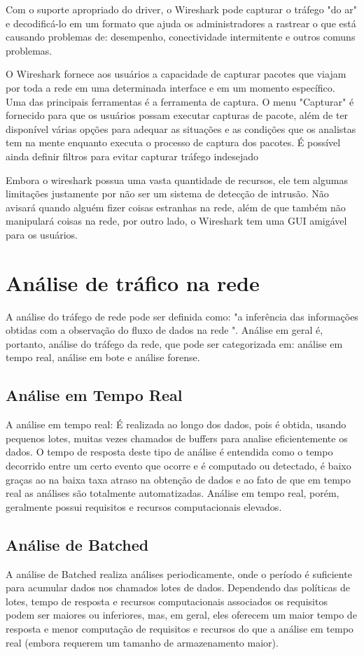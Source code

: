 \documentclass[12pt]{article}
\begin{document}
Com o suporte apropriado do driver, o Wireshark pode
capturar o tráfego "do ar" e decodificá-lo em um formato que
ajuda os administradores a rastrear o que está causando problemas
de: desempenho, conectividade intermitente e outros comuns
problemas.

O Wireshark fornece aos usuários a capacidade de capturar
pacotes que viajam por toda a rede em uma determinada
interface e em um momento específico. Uma das principais ferramentas é a
ferramenta de captura. O menu "Capturar" é fornecido para que os usuários possam
executar capturas de pacote, além de ter disponível várias opções
para adequar as situações e as condições que os analistas
tem na mente enquanto executa o processo de captura dos pacotes. É possível ainda definir filtros para evitar capturar tráfego indesejado

Embora o  wireshark possua uma vasta quantidade de recursos, ele  tem algumas limitações justamente por não ser um
sistema de detecção de intrusão. Não avisará quando
alguém fizer coisas estranhas na  rede, além de que também não manipulará coisas
na rede, por outro lado, o Wireshark tem uma GUI amigável para os usuários.  

\section{Análise de tráfico na rede}

A análise do tráfego de rede pode ser definida como: "a inferência das informações obtidas com a observação do fluxo de dados na rede ". Análise em geral é, portanto, análise do tráfego da rede, que pode ser categorizada em: análise em tempo real, análise em bote e análise forense.
\subsection{Análise em Tempo Real}
A análise em tempo real:  É realizada ao longo dos dados, pois é obtida, usando pequenos lotes, muitas vezes chamados de buffers para analise eficientemente os dados. O tempo de resposta deste tipo de análise é entendida como o tempo decorrido entre um certo evento que ocorre e é computado ou detectado, é baixo graças ao na baixa taxa atraso na obtenção de dados e ao fato de que em tempo real as análises são totalmente automatizadas. Análise em tempo real, porém, geralmente possui requisitos e recursos computacionais elevados.

\subsection{Análise de Batched}
A análise de Batched realiza análises periodicamente, onde o período é suficiente para acumular dados nos chamados lotes de dados. Dependendo das políticas de lotes, tempo de resposta e recursos computacionais associados os requisitos podem ser maiores ou inferiores, mas, em geral, eles oferecem um maior tempo de resposta e menor computação de requisitos e recursos do que a análise em tempo real (embora requerem um tamanho de armazenamento maior).
\end{document}
